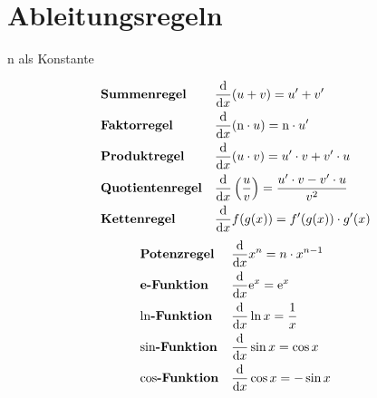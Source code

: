 \documentclass{article}
\begin{document}
\section{Ableitungsregeln}
$\mathrm{n}$ als Konstante 
\begin{multicols}{2} 
 \noindent \begin{align*}
  &\text{\textbf{Summenregel}} &&\frac{\mathrm{d}}{\mathrm{d}x} (u + v) = u' + v' \\
  &\text{\textbf{Faktorregel}} &&\frac{\mathrm{d}}{\mathrm{d}x} (\mathrm{n} \cdot u) = \mathrm{n} \cdot u' \\  
  &\text{\textbf{Produktregel}} &&\frac{\mathrm{d}}{\mathrm{d}x} (u \cdot v) = u' \cdot v + v' \cdot u \\
  &\text{\textbf{Quotientenregel}} &&\frac{\mathrm{d}}{\mathrm{d}x} \left( \frac{u}{v} \right) = \frac{u' \cdot v - v' \cdot u}{v^2} \\
 &\text{\textbf{Kettenregel}} &&\frac{\mathrm{d}}{\mathrm{d}x} f(g(x)) = f'(g(x)) \cdot g'(x) \\
 \end{align*} 
 \begin{align*}
  &\text{\textbf{Potenzregel}} &&\frac{\mathrm{d}}{\mathrm{d}x} x^n = n \cdot x^{n-1} \\ 
  &\text{\textbf{e-Funktion}} &&\frac{\mathrm{d}}{\mathrm{d}x} \mathrm{e}^x = \mathrm{e}^x \\
  &\text{\textbf{$\ln$-Funktion}} &&\frac{\mathrm{d}}{\mathrm{d}x} \ln x = \frac{1}{x} \\
  &\text{\textbf{$\sin$-Funktion}} &&\frac{\mathrm{d}}{\mathrm{d}x} \sin x = \cos x \\
  &\text{\textbf{$\cos$-Funktion}} &&\frac{\mathrm{d}}{\mathrm{d}x} \cos x = -\sin x
 \end{align*} 
\end{multicols} 
\end{document}
